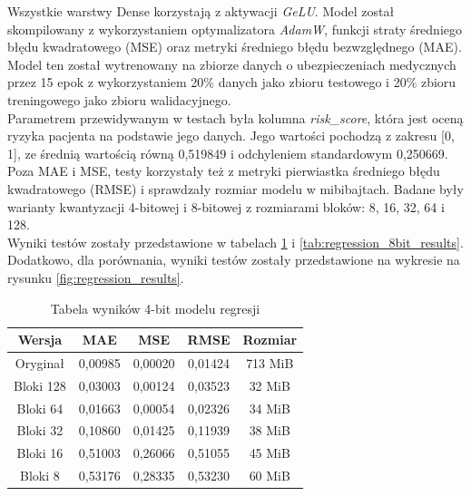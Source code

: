 Wszystkie warstwy Dense korzystają z aktywacji \textit{GeLU}. Model został skompilowany z wykorzystaniem optymalizatora \textit{AdamW}, funkcji straty średniego błędu kwadratowego (MSE) oraz metryki średniego błędu bezwzględnego (MAE). \\
Model ten został wytrenowany na zbiorze danych o ubezpieczeniach medycznych przez 15 epok z wykorzystaniem 20\% danych jako zbioru testowego i 20\% zbioru treningowego jako zbioru walidacyjnego. \\
Parametrem przewidywanym w testach była kolumna \textit{risk\_score}, która jest oceną ryzyka pacjenta na podstawie jego danych. Jego wartości pochodzą z zakresu [0, 1], ze średnią wartością równą 0,519849 i odchyleniem standardowym 0,250669.\\
Poza MAE i MSE, testy korzystały też z metryki pierwiastka średniego błędu kwadratowego (RMSE) i sprawdzały rozmiar modelu w mibibajtach. Badane były warianty kwantyzacji 4-bitowej i 8-bitowej z rozmiarami bloków: 8, 16, 32, 64 i 128. \\
Wyniki testów zostały przedstawione w tabelach \ref{tab:regression_4bit_results} i \ref{tab:regression_8bit_results}. Dodatkowo, dla porównania, wyniki testów zostały przedstawione na wykresie na rysunku \ref{fig:regression_results}.
\begin{table}
    \centering
    \caption{Tabela wyników 4-bit modelu regresji}
    \label{tab:regression_4bit_results}
    \begin{tabular}{|c|c|c|c|c|}
        \hline
        \textbf{Wersja} & \textbf{MAE} & \textbf{MSE} & \textbf{RMSE} & \textbf{Rozmiar} \\
        \hline
        Oryginał & 0,00985 & 0,00020 & 0,01424 & 713 MiB \\
        \hline
        Bloki 128 & 0,03003 & 0,00124 & 0,03523 & 32 MiB \\
        \hline
        Bloki 64 & 0,01663 & 0,00054 & 0,02326 & 34 MiB \\
        \hline
        Bloki 32 & 0,10860 & 0,01425 & 0,11939 & 38 MiB \\
        \hline
        Bloki 16 & 0,51003 & 0,26066 & 0,51055 & 45 MiB \\
        \hline
        Bloki 8 & 0,53176 & 0,28335 & 0,53230 & 60 MiB \\
        \hline
    \end{tabular}
\end{table}
